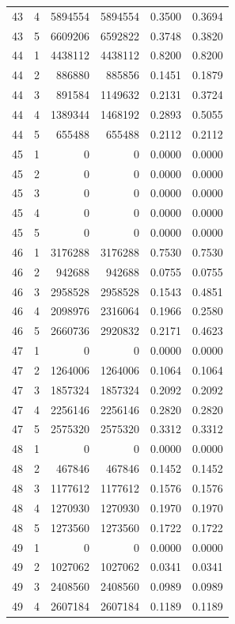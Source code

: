 \begin{longtable}{rrrrrr}
43 & 4 & 5894554 & 5894554 & 0.3500 & 0.3694 \\
43 & 5 & 6609206 & 6592822 & 0.3748 & 0.3820 \\
44 & 1 & 4438112 & 4438112 & 0.8200 & 0.8200 \\
44 & 2 & 886880 & 885856 & 0.1451 & 0.1879 \\
44 & 3 & 891584 & 1149632 & 0.2131 & 0.3724 \\
44 & 4 & 1389344 & 1468192 & 0.2893 & 0.5055 \\
44 & 5 & 655488 & 655488 & 0.2112 & 0.2112 \\
45 & 1 & 0 & 0 & 0.0000 & 0.0000 \\
45 & 2 & 0 & 0 & 0.0000 & 0.0000 \\
45 & 3 & 0 & 0 & 0.0000 & 0.0000 \\
45 & 4 & 0 & 0 & 0.0000 & 0.0000 \\
45 & 5 & 0 & 0 & 0.0000 & 0.0000 \\
46 & 1 & 3176288 & 3176288 & 0.7530 & 0.7530 \\
46 & 2 & 942688 & 942688 & 0.0755 & 0.0755 \\
46 & 3 & 2958528 & 2958528 & 0.1543 & 0.4851 \\
46 & 4 & 2098976 & 2316064 & 0.1966 & 0.2580 \\
46 & 5 & 2660736 & 2920832 & 0.2171 & 0.4623 \\
47 & 1 & 0 & 0 & 0.0000 & 0.0000 \\
47 & 2 & 1264006 & 1264006 & 0.1064 & 0.1064 \\
47 & 3 & 1857324 & 1857324 & 0.2092 & 0.2092 \\
47 & 4 & 2256146 & 2256146 & 0.2820 & 0.2820 \\
47 & 5 & 2575320 & 2575320 & 0.3312 & 0.3312 \\
48 & 1 & 0 & 0 & 0.0000 & 0.0000 \\
48 & 2 & 467846 & 467846 & 0.1452 & 0.1452 \\
48 & 3 & 1177612 & 1177612 & 0.1576 & 0.1576 \\
48 & 4 & 1270930 & 1270930 & 0.1970 & 0.1970 \\
48 & 5 & 1273560 & 1273560 & 0.1722 & 0.1722 \\
49 & 1 & 0 & 0 & 0.0000 & 0.0000 \\
49 & 2 & 1027062 & 1027062 & 0.0341 & 0.0341 \\
49 & 3 & 2408560 & 2408560 & 0.0989 & 0.0989 \\
49 & 4 & 2607184 & 2607184 & 0.1189 & 0.1189 \\

\end{longtable}
